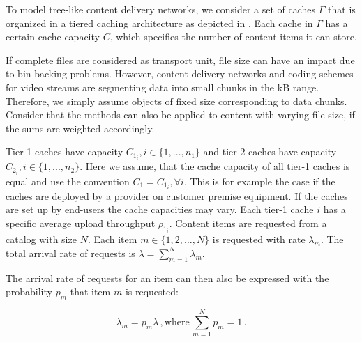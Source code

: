 To model tree-like content delivery networks, we consider a set of caches $\Gamma$ that is organized in a tiered caching architecture as depicted in . Each cache in $\Gamma$ has a certain cache capacity $C$, which specifies the number of content items it can store.

If complete files are considered as transport unit, file size can have an impact due to bin-backing problems.
However, content delivery networks and coding schemes for video streams are segmenting data into small chunks in the kB range.
Therefore, we simply assume objects of fixed size corresponding to data chunks.
Consider that the methods can also be applied to content with varying file size, if the sums are weighted accordingly.

Tier-1 caches have capacity $C_{1_i}, i\in\{1,...,n_1\}$ and tier-2 caches have capacity $C_{2_i}, i\in\{1,...,n_2\}$.
Here we assume, that the cache capacity of all tier-1 caches is equal and use the convention $C_1=C_{1_i}, \forall i$.
This is for example the case if the caches are deployed by a provider on customer premise equipment.
If the caches are set up by end-users the cache capacities may vary.
Each tier-1 cache $i$ has a specific average upload throughput $\rho_{1_i}$.
Content items are requested from a catalog with size $N$.
Each item $m\in \{1,2,\dots,N\}$ is requested with rate $\lambda_m$.
The total arrival rate of requests is $\lambda=\sum_{m=1}^N \lambda_m$.

The arrival rate of requests for an item can then also be expressed with the probability $p_m$ that item $m$ is requested:

\begin{equation}
\lambda_m = p_m \lambda \, , \text{where} \, \sum_{m=1}^N p_m = 1 \, .
\end{equation}



